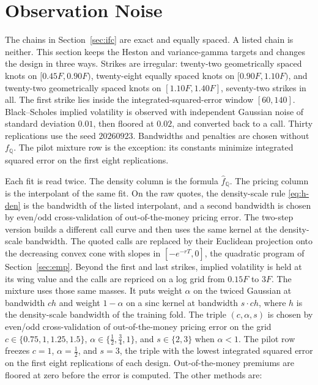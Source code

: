 \documentclass[preprint,12pt,authoryear,times]{elsarticle}
\newcommand{\Q}{\mathbb{Q}}
\begin{document}
\section{Observation Noise}
\label{sec:noise}

The chains in Section~\ref{sec:ifc} are exact and equally spaced. A listed chain is neither. This section keeps the Heston and variance-gamma targets and changes the design in three ways. Strikes are irregular: twenty-two geometrically spaced knots on \([0.45F,0.90F)\), twenty-eight equally spaced knots on \([0.90F,1.10F)\), and twenty-two geometrically spaced knots on \([1.10F,1.40F]\), seventy-two strikes in all. The first strike lies inside the integrated-squared-error window \([60,140]\). Black--Scholes implied volatility is observed with independent Gaussian noise of standard deviation \(0.01\), then floored at \(0.02\), and converted back to a call. Thirty replications use the seed \(20260923\). Bandwidths and penalties are chosen without \(f_{\Q}\). The pilot mixture row is the exception: its constants minimize integrated squared error on the first eight replications.

Each fit is read twice. The density column is the formula \(\hat f_{\Q}\). The pricing column is the interpolant of the same fit. On the raw quotes, the density-scale rule \eqref{eq:h-den} is the bandwidth of the listed interpolant, and a second bandwidth is chosen by even/odd cross-validation of out-of-the-money pricing error. The two-step version builds a different call curve and then uses the same kernel at the density-scale bandwidth. The quoted calls are replaced by their Euclidean projection onto the decreasing convex cone with slopes in \([-e^{-rT},0]\), the quadratic program of Section~\ref{sec:emp}. Beyond the first and last strikes, implied volatility is held at its wing value and the calls are repriced on a log grid from \(0.15F\) to \(3F\). The mixture uses those same masses. It puts weight \(\alpha\) on the twiced Gaussian at bandwidth \(c h\) and weight \(1-\alpha\) on a sinc kernel at bandwidth \(s\cdot c h\), where \(h\) is the density-scale bandwidth of the training fold. The triple \((c,\alpha,s)\) is chosen by even/odd cross-validation of out-of-the-money pricing error on the grid \(c\in\{0.75,1,1.25,1.5\}\), \(\alpha\in\{\tfrac12,\tfrac34,1\}\), and \(s\in\{2,3\}\) when \(\alpha<1\). The pilot row freezes \(c=1\), \(\alpha=\tfrac12\), and \(s=3\), the triple with the lowest integrated squared error on the first eight replications of each design. Out-of-the-money premiums are floored at zero before the error is computed. The other methods are:
\end{document}
